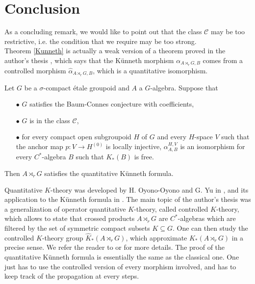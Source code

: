\section{Conclusion}

As a concluding remark, we would like to point out that the class $\mathcal C$ may be too restrictive, i.e. the condition that we require may be too strong. \\

Theorem \ref{Kunneth} is actually a weak version of a theorem proved in the author's thesis \cite{DellAieraThesis}, which says that the Künneth morphism $\alpha_{A\rtimes_r G,B}$ comes from a controlled morphism $\hat \alpha_{A\rtimes_r G,B}$, which is a quantitative isomorphism.

\begin{thm}
Let $G$ be a $\sigma$-compact étale groupoid and $A$ a $G$-algebra. Suppose that 
\begin{itemize}
\item[$\bullet$] $G$ satisfies the Baum-Connes conjecture with coefficients,
\item[$\bullet$] $G$ is in the class $\mathcal C$,
\item[$\bullet$] for every compact open subgroupoid $H$ of $G$ and every $H$-space $V$ such that the anchor map $p : V \rightarrow H^{(0)}$ is locally injective, $\alpha_{A,B}^{H,V}$ is an isomorphism for every $C^*$-algebra $B$ such that $K_*(B)$ is free.
\end{itemize} 
Then $A\rtimes_r G$ satisfies the quantitative Künneth formula.
\end{thm}

Quantitative $K$-theory was developed by H. Oyono-Oyono and G. Yu in \cite{OY2}, and its application to the Künneth formula in \cite{OY4}. The main topic of the author's thesis \cite{DellAieraThesis} was a generalization of operator quantitative $K$-theory, called controlled $K$-theory, which allows to state that crossed products $A\rtimes_r G$ are $C^*$-algebras which are filtered by the set of symmetric compact subsets $K\subseteq G$. One can then study the controlled $K$-theory group $\hat K_*(A\rtimes_r G)$, which approximate $K_*(A\rtimes_r G)$ in a precise sense. We refer the reader to \cite{DellAieraThesis} or \cite{dell2017controlled} for more details. The proof of the quantitative Künneth formula is essentially the same as the classical one. One just has to use the controlled version of every morphism involved, and has to keep track of the propagation at every steps. \\

